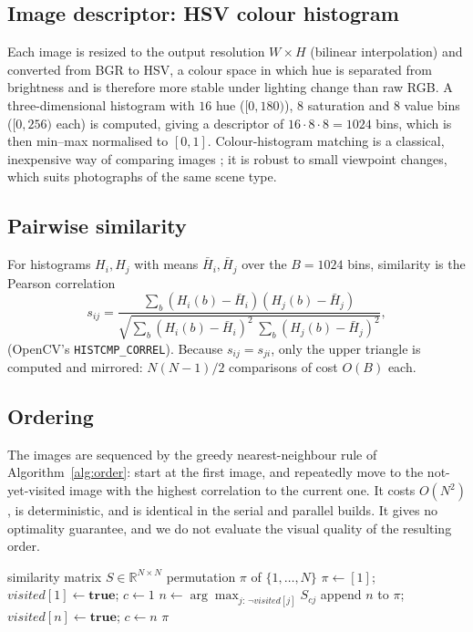 \documentclass[conference]{IEEEtran}
\begin{document}
\subsection{Image descriptor: HSV colour histogram}
Each image is resized to the output resolution $W\times H$ (bilinear interpolation) and converted from BGR to HSV, a colour space in which hue is separated from brightness and is therefore more stable under lighting change than raw RGB. A three-dimensional histogram with $16$ hue ($[0,180)$), $8$ saturation and $8$ value bins ($[0,256)$ each) is computed, giving a descriptor of $16\cdot 8\cdot 8=1024$ bins, which is then min--max normalised to $[0,1]$. Colour-histogram matching is a classical, inexpensive way of comparing images \cite{swain1991}; it is robust to small viewpoint changes, which suits photographs of the same scene type.

\subsection{Pairwise similarity}
For histograms $H_i, H_j$ with means $\bar H_i,\bar H_j$ over the $B=1024$ bins, similarity is the Pearson correlation
\begin{equation}
  s_{ij}=\frac{\sum_{b}(H_i(b)-\bar H_i)(H_j(b)-\bar H_j)}
  {\sqrt{\sum_{b}(H_i(b)-\bar H_i)^2\;\sum_{b}(H_j(b)-\bar H_j)^2}},
  \label{eq:corr}
\end{equation}
(OpenCV's \texttt{HISTCMP\_CORREL}). Because $s_{ij}=s_{ji}$, only the upper triangle is computed and mirrored: $N(N-1)/2$ comparisons of cost $O(B)$ each.

\subsection{Ordering}
The images are sequenced by the greedy nearest-neighbour rule of Algorithm~\ref{alg:order}: start at the first image, and repeatedly move to the not-yet-visited image with the highest correlation to the current one. It costs $O(N^2)$, is deterministic, and is identical in the serial and parallel builds. It gives no optimality guarantee, and we do not evaluate the visual quality of the resulting order.

\begin{algorithm}[t]
\caption{Greedy similarity ordering}
\label{alg:order}
\begin{algorithmic}[1]
\Require similarity matrix $S\in\mathbb{R}^{N\times N}$
\Ensure permutation $\pi$ of $\{1,\dots,N\}$
\State $\pi \gets [1]$;\; $\textit{visited}[1]\gets \textbf{true}$;\; $c \gets 1$
  \State $n \gets \arg\max_{j:\,\neg\textit{visited}[j]} S_{cj}$
  \State append $n$ to $\pi$;\; $\textit{visited}[n]\gets\textbf{true}$;\; $c\gets n$
\EndFor
\State \Return $\pi$
\end{algorithmic}
\end{algorithm}
\end{document}
